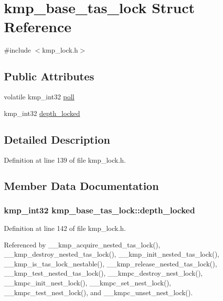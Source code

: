 \hypertarget{structkmp__base__tas__lock}{\section{kmp\-\_\-base\-\_\-tas\-\_\-lock Struct Reference}
\label{structkmp__base__tas__lock}
}


{\ttfamily \#include $<$kmp\-\_\-lock.\-h$>$}

\subsection*{Public Attributes}
\begin{DoxyCompactItemize}
\item 
volatile kmp\-\_\-int32 \hyperlink{structkmp__base__tas__lock_a32c35f002d15ce50345770498ab6b0c0}{poll}
\item 
kmp\-\_\-int32 \hyperlink{structkmp__base__tas__lock_a78d8935d7c7391732f7e6ff82ee8da15}{depth\-\_\-locked}
\end{DoxyCompactItemize}


\subsection{Detailed Description}


Definition at line 139 of file kmp\-\_\-lock.\-h.



\subsection{Member Data Documentation}
\hypertarget{structkmp__base__tas__lock_a78d8935d7c7391732f7e6ff82ee8da15}{
\subsubsection[{depth\-\_\-locked}]{\setlength{\rightskip}{0pt plus 5cm}kmp\-\_\-int32 kmp\-\_\-base\-\_\-tas\-\_\-lock\-::depth\-\_\-locked}}\label{structkmp__base__tas__lock_a78d8935d7c7391732f7e6ff82ee8da15}


Definition at line 142 of file kmp\-\_\-lock.\-h.



Referenced by \-\_\-\-\_\-kmp\-\_\-acquire\-\_\-nested\-\_\-tas\-\_\-lock(), \-\_\-\-\_\-kmp\-\_\-destroy\-\_\-nested\-\_\-tas\-\_\-lock(), \-\_\-\-\_\-kmp\-\_\-init\-\_\-nested\-\_\-tas\-\_\-lock(), \-\_\-\-\_\-kmp\-\_\-is\-\_\-tas\-\_\-lock\-\_\-nestable(), \-\_\-\-\_\-kmp\-\_\-release\-\_\-nested\-\_\-tas\-\_\-lock(), \-\_\-\-\_\-kmp\-\_\-test\-\_\-nested\-\_\-tas\-\_\-lock(), \-\_\-\-\_\-kmpc\-\_\-destroy\-\_\-nest\-\_\-lock(), \-\_\-\-\_\-kmpc\-\_\-init\-\_\-nest\-\_\-lock(), \-\_\-\-\_\-kmpc\-\_\-set\-\_\-nest\-\_\-lock(), \-\_\-\-\_\-kmpc\-\_\-test\-\_\-nest\-\_\-lock(), and \-\_\-\-\_\-kmpc\-\_\-unset\-\_\-nest\-\_\-lock().

